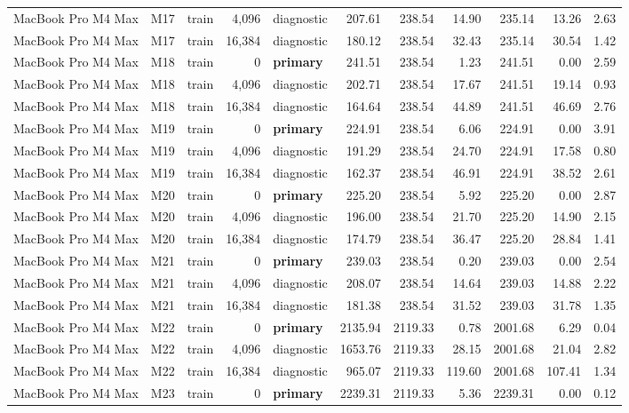 \documentclass[10pt]{article}
\begin{document}
\begin{landscape}
\begin{longtable}{@{}l l l r l r r r r r r@{}}
MacBook Pro M4 Max & M17 & train & 4,096 & diagnostic & 207.61 & 238.54 & 14.90 & 235.14 & 13.26 & 2.63 \\
MacBook Pro M4 Max & M17 & train & 16,384 & diagnostic & 180.12 & 238.54 & 32.43 & 235.14 & 30.54 & 1.42 \\
MacBook Pro M4 Max & M18 & train & 0 & \textbf{primary} & 241.51 & 238.54 & 1.23 & 241.51 & 0.00 & 2.59 \\
MacBook Pro M4 Max & M18 & train & 4,096 & diagnostic & 202.71 & 238.54 & 17.67 & 241.51 & 19.14 & 0.93 \\
MacBook Pro M4 Max & M18 & train & 16,384 & diagnostic & 164.64 & 238.54 & 44.89 & 241.51 & 46.69 & 2.76 \\
MacBook Pro M4 Max & M19 & train & 0 & \textbf{primary} & 224.91 & 238.54 & 6.06 & 224.91 & 0.00 & 3.91 \\
MacBook Pro M4 Max & M19 & train & 4,096 & diagnostic & 191.29 & 238.54 & 24.70 & 224.91 & 17.58 & 0.80 \\
MacBook Pro M4 Max & M19 & train & 16,384 & diagnostic & 162.37 & 238.54 & 46.91 & 224.91 & 38.52 & 2.61 \\
MacBook Pro M4 Max & M20 & train & 0 & \textbf{primary} & 225.20 & 238.54 & 5.92 & 225.20 & 0.00 & 2.87 \\
MacBook Pro M4 Max & M20 & train & 4,096 & diagnostic & 196.00 & 238.54 & 21.70 & 225.20 & 14.90 & 2.15 \\
MacBook Pro M4 Max & M20 & train & 16,384 & diagnostic & 174.79 & 238.54 & 36.47 & 225.20 & 28.84 & 1.41 \\
MacBook Pro M4 Max & M21 & train & 0 & \textbf{primary} & 239.03 & 238.54 & 0.20 & 239.03 & 0.00 & 2.54 \\
MacBook Pro M4 Max & M21 & train & 4,096 & diagnostic & 208.07 & 238.54 & 14.64 & 239.03 & 14.88 & 2.22 \\
MacBook Pro M4 Max & M21 & train & 16,384 & diagnostic & 181.38 & 238.54 & 31.52 & 239.03 & 31.78 & 1.35 \\
MacBook Pro M4 Max & M22 & train & 0 & \textbf{primary} & 2135.94 & 2119.33 & 0.78 & 2001.68 & 6.29 & 0.04 \\
MacBook Pro M4 Max & M22 & train & 4,096 & diagnostic & 1653.76 & 2119.33 & 28.15 & 2001.68 & 21.04 & 2.82 \\
MacBook Pro M4 Max & M22 & train & 16,384 & diagnostic & 965.07 & 2119.33 & 119.60 & 2001.68 & 107.41 & 1.34 \\
MacBook Pro M4 Max & M23 & train & 0 & \textbf{primary} & 2239.31 & 2119.33 & 5.36 & 2239.31 & 0.00 & 0.12 \\

\end{longtable}
\end{landscape}
\end{document}
